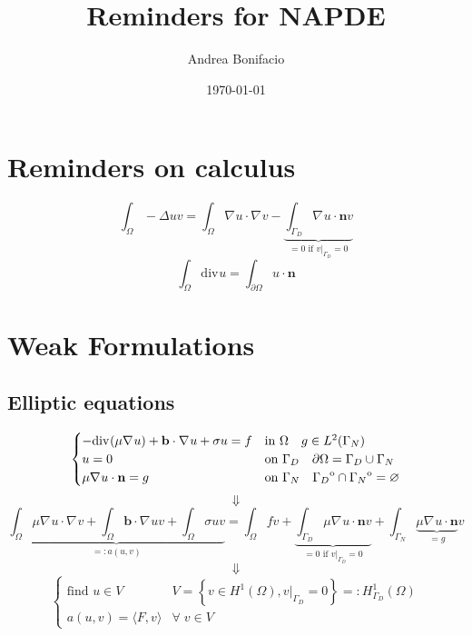 \documentclass[a4paper,11pt]{article}
\theoremstyle{break}
\renewcommand*{\grad}{\nabla\mspace{1mu}}
\renewcommand*{\div}{\text{div}\mspace{1mu}}
\newcommand{\vect}[1]{\textbf{#1}}
\let\emptyset\varnothing
\newcommand*{\txt}[1]{\text{#1}}
\newcommand{\scalarproduct}[2]{\langle #1,#2 \rangle}
\newcommand{\interior}[1]{%
 {\kern0pt#1}^{\mathrm{o}}%
}
\newcommand{\boundary}{{\partial\Omega}}
\newcommand{\find}{\txt{find }}
\numberwithin{equation}{section}
\begin{document}
\title{Reminders for NAPDE}
\author{Andrea Bonifacio}
\date{\today}
\maketitle
\section*{Reminders on calculus}
\[
    \int_\Omega-\Delta u v = \int_\Omega \grad u \cdot \grad v - \underbrace{\int_{\Gamma_D}  \grad u \cdot \vect{n} v}_{= 0 \txt{ if } v\vert_{\Gamma_D} = 0}
\]
\[
    \int_\Omega \div u = \int_\boundary u \cdot \vect{n} 
\]
\section*{Weak Formulations}
\subsection*{Elliptic equations}
\begin{equation*}
    \begin{cases}
        -\div(\mu \grad u)+ \vect{b}\cdot \grad u + \sigma u = f& \text{in } \Omega \quad g \in L^2(\Gamma_N) \\
        u = 0 & \txt{on }\Gamma_D \quad \partial\Omega = \Gamma_D \cup \Gamma_N \\

        \mu \grad u \cdot \vect{n} = g & \txt{on } \Gamma_N \quad \interior{\Gamma_D} \cap \interior{\Gamma_N} = \emptyset
    \end{cases}
\end{equation*}
\[
    \Downarrow
\]
\begin{equation*}
    \underbrace{\int_\Omega \mu\grad u \cdot \grad v  + \int_\Omega \vect{b} \cdot \grad u v + \int_\Omega \sigma u v}_{=: a(u,v)} = \int_\Omega f v +\underbrace{\int_{\Gamma_D} \mu \grad u \cdot \vect{n} v}_{= 0 \txt{ if } v\vert_{\Gamma_D} = 0} + \int_{\Gamma_N} \underbrace{\mu \grad u \cdot \vect{n}}_{= g} v 
\end{equation*}
\[
    \Downarrow
\]
\begin{equation*}
    \begin{cases}
        \find u \in V & V = \left\{v \in H^1(\Omega), v\vert_{\Gamma_D} = 0\right\} =: H^1_{\Gamma_D}(\Omega)\\
        a(u,v) = \scalarproduct{F}{v} & \forall \; v \in V \label{Weak Formulation of Boundary Value Problems}
    \end{cases}
\end{equation*}
\end{document}
